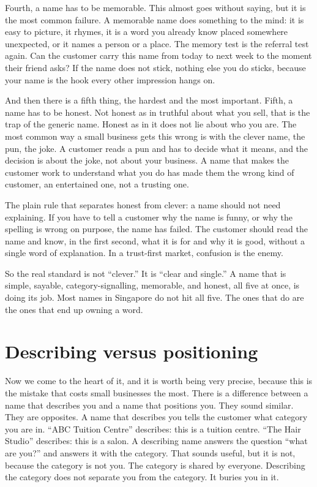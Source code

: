 \documentclass[10pt,twoside,openany]{memoir}
\newcommand{\needspacehead}{\needspace{4\baselineskip}}
\let\oldsection\section
\renewcommand{\section}{\needspacehead\oldsection}
\begin{document}
{Fourth, a name has to be memorable. This almost goes without saying, but
it is the most common failure. A memorable name does something to the
mind: it is easy to picture, it rhymes, it is a word you already know
placed somewhere unexpected, or it names a person or a place. The memory
test is the referral test again. Can the customer carry this name from
today to next week to the moment their friend asks? If the name does not
stick, nothing else you do sticks, because your name is the hook every
other impression hangs on.

And then there is a fifth thing, the hardest and the most important.
Fifth, a name has to be honest. Not honest as in truthful about what you
sell, that is the trap of the generic name. Honest as in it does not lie
about who you are. The most common way a small business gets this wrong
is with the clever name, the pun, the joke. A customer reads a pun and
has to decide what it means, and the decision is about the joke, not
about your business. A name that makes the customer work to understand
what you do has made them the wrong kind of customer, an entertained
one, not a trusting one.

The plain rule that separates honest from clever: a name should not need
explaining. If you have to tell a customer why the name is funny, or why
the spelling is wrong on purpose, the name has failed. The customer
should read the name and know, in the first second, what it is for and
why it is good, without a single word of explanation. In a trust-first
market, confusion is the enemy.

So the real standard is not ``clever.'' It is ``clear and single.'' A
name that is simple, sayable, category-signalling, memorable, and
honest, all five at once, is doing its job. Most names in Singapore do
not hit all five. The ones that do are the ones that end up owning a
word.

\section{Describing versus
positioning}\label{describing-versus-positioning}

Now we come to the heart of it, and it is worth being very precise,
because this is the mistake that costs small businesses the most. There
is a difference between a name that describes you and a name that
positions you. They sound similar. They are opposites. A name that
describes you tells the customer what category you are in. ``ABC Tuition
Centre'' describes: this is a tuition centre. ``The Hair Studio''
describes: this is a salon. A describing name answers the question
``what are you?'' and answers it with the category. That sounds useful,
but it is not, because the category is not you. The category is shared
by everyone. Describing the category does not separate you from the
category. It buries you in it.

}
\end{document}

